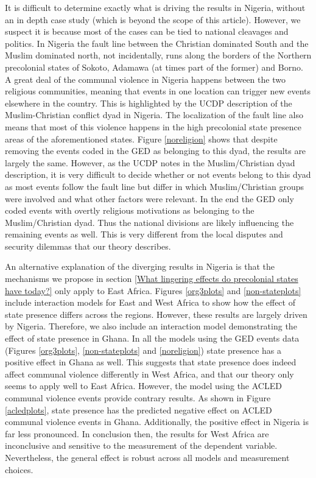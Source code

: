 It is difficult to determine exactly what is driving the results in Nigeria,
without an in depth case study (which is beyond the scope of this article).
However, we suspect it is because most of the cases can be tied to national
cleavages and politics. In Nigeria the fault line between the Christian
dominated South and the Muslim dominated north, not incidentally, runs along the
borders of the Northern precolonial states of Sokoto, Adamawa (at times part of
the former) and Borno. A great deal of the communal violence in Nigeria happens
between the two religious communities, meaning that events in one location can
trigger new events elsewhere in the country. This is highlighted by the UCDP
description of the Muslim-Christian conflict dyad in Nigeria. The localization
of the fault line also means that most of this violence happens in the high
precolonial state presence areas of the aforementioned states. Figure
\ref{noreligion} shows that despite removing the events coded in the GED as
belonging to this dyad, the results are largely the same. However, as the UCDP
notes in the Muslim/Christian dyad description, it is very difficult to decide
whether or not events belong to this dyad as most events follow the fault line
but differ in which Muslim/Christian groups were involved and what other factors
were relevant. In the end the GED only coded events with overtly religious
motivations as belonging to the Muslim/Christian dyad. Thus the national
divisions are likely influencing the remaining events as well. This is very
different from the local disputes and security dilemmas that our theory
describes. 

An alternative explanation of the diverging results in Nigeria is that the
mechanisms we propose in section \ref{What lingering effects do precolonial
states have today?} only apply to East Africa. Figures \ref{org3plots} and
\ref{non-stateplots} include interaction models for East and West Africa to
show how the effect of state presence differs across the regions. However, these
results are largely driven by Nigeria. Therefore, we also include an interaction
model demonstrating the effect of state presence in Ghana. In all the models
using the GED events data (Figures \ref{org3plots}, \ref{non-stateplots} and
\ref{noreligion}) state presence has a positive effect in Ghana as well. This
suggests that state presence does indeed affect communal violence differently in
West Africa, and that our theory only seems to apply well to East Africa.
However, the model using the ACLED communal violence events provide contrary
results. As shown in Figure \ref{acledplots}, state presence has the predicted
negative effect on ACLED communal violence events in Ghana. Additionally, the
positive effect in Nigeria is far less pronounced. In conclusion then, the
results for West Africa are inconclusive and sensitive to the measurement of the
dependent variable. Nevertheless, the general effect is robust across all models
and measurement choices.


